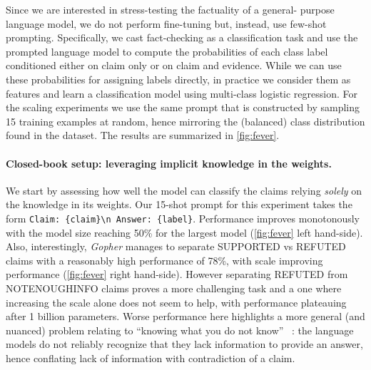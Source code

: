 \documentclass[11pt, a4paper, logo, internal, copyright, nonumbering]{deepmind}
\newcommand{\gopher}{\textit{Gopher}\xspace}
\begin{document}
Since we are interested in stress-testing the factuality of a general- purpose language model, we do not perform fine-tuning but, instead, use few-shot prompting. Specifically, we cast fact-checking as a classification task and use the prompted language model to compute the probabilities of each class label conditioned either on claim only or on claim and evidence.  While we can use these probabilities for assigning labels directly, in practice we consider them as features and learn a classification model using multi-class logistic regression. For the scaling experiments we use the same prompt that is constructed by sampling 15 training examples at random, hence mirroring the (balanced) class distribution found in the dataset. The results are summarized in \autoref{fig:fever}.

\paragraph{Closed-book setup: leveraging implicit knowledge in the weights.}
We start by assessing how well the model can classify the claims relying \textit{solely} on the knowledge in its weights. Our 15-shot prompt for this experiment takes the form \texttt{Claim: \{claim\}\textbackslash n Answer: \{label\}}.
Performance improves monotonously with the model size reaching 50\% for the largest model (\autoref{fig:fever} left hand-side). Also, interestingly, \gopher manages to separate SUPPORTED vs REFUTED claims with a reasonably high performance of 78\%, with scale improving performance (\autoref{fig:fever} right hand-side). However separating REFUTED from NOTENOUGHINFO claims proves a more challenging task and a one where increasing the scale alone does not seem to help, with performance plateauing after 1 billion parameters. Worse performance here highlights a more general (and nuanced) problem relating to ``knowing what you do not know'' ~\citep{rajpurkar2018know}: the language models do not reliably recognize that they lack information to provide an answer, hence conflating lack of information with contradiction of a claim. 
\end{document}
